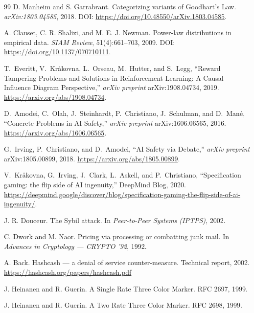 \documentclass[11pt]{article}
\newcommand{\1}{\mathbf{1}}
\theoremstyle{definition}
\theoremstyle{plain}
\begin{document}
\begin{thebibliography}{99}
D. Manheim and S. Garrabrant.
Categorizing variants of Goodhart's Law.
\emph{arXiv:1803.04585}, 2018. DOI: \url{https://doi.org/10.48550/arXiv.1803.04585}.

A. Clauset, C. R. Shalizi, and M. E. J. Newman.
Power-law distributions in empirical data.
\emph{SIAM Review}, 51(4):661--703, 2009. DOI: \url{https://doi.org/10.1137/070710111}.

T.~Everitt, V.~Kr{\aa}kovna, L.~Orseau, M.~Hutter, and S.~Legg,
\newblock ``Reward Tampering Problems and Solutions in Reinforcement Learning: A Causal Influence Diagram Perspective,''
\newblock \emph{arXiv preprint} arXiv:1908.04734, 2019.
\newblock \url{https://arxiv.org/abs/1908.04734}.

D.~Amodei, C.~Olah, J.~Steinhardt, P.~Christiano, J.~Schulman, and D.~Man{\'e},
\newblock ``Concrete Problems in AI Safety,''
\newblock \emph{arXiv preprint} arXiv:1606.06565, 2016.
\newblock \url{https://arxiv.org/abs/1606.06565}.

G.~Irving, P.~Christiano, and D.~Amodei,
\newblock ``AI Safety via Debate,''
\newblock \emph{arXiv preprint} arXiv:1805.00899, 2018.
\newblock \url{https://arxiv.org/abs/1805.00899}.

V.~Kr{\aa}kovna, G.~Irving, J.~Clark, L.~Askell, and P.~Christiano,
\newblock ``Specification gaming: the flip side of AI ingenuity,''
\newblock DeepMind Blog, 2020.
\newblock \url{https://deepmind.google/discover/blog/specification-gaming-the-flip-side-of-ai-ingenuity/}.



J. R. Douceur.
The Sybil attack.
In \emph{Peer-to-Peer Systems (IPTPS)}, 2002.

C. Dwork and M. Naor.
Pricing via processing or combatting junk mail.
In \emph{Advances in Cryptology --- CRYPTO '92}, 1992.

A. Back.
Hashcash --- a denial of service counter-measure.
Technical report, 2002.
\href{https://hashcash.org/papers/hashcash.pdf}{https://hashcash.org/papers/hashcash.pdf}

J. Heinanen and R. Guerin.
A Single Rate Three Color Marker.
RFC 2697, 1999.

J. Heinanen and R. Guerin.
A Two Rate Three Color Marker.
RFC 2698, 1999.
\end{thebibliography}
\end{document}
